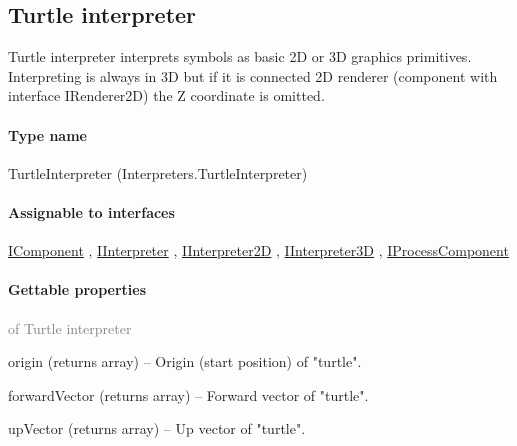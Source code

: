 \subsection{Turtle interpreter}
\label{Malsys.Processing.Components.Interpreters.TurtleInterpreter}
Turtle interpreter interprets symbols as basic 2D or 3D graphics primitives.
            Interpreting is always in 3D but if it is connected 2D renderer
            (component with interface IRenderer2D) the Z coordinate is omitted.\paragraph{Type name}
TurtleInterpreter (Interpreters.TurtleInterpreter) 	\paragraph{Assignable to interfaces}
		\hyperref[Malsys.Processing.Components.IComponent]{IComponent}%
, 		\hyperref[Malsys.Processing.Components.IInterpreter]{IInterpreter}%
, 		\hyperref[Malsys.Processing.Components.Interpreters.IInterpreter2D]{IInterpreter2D}%
, 		\hyperref[Malsys.Processing.Components.Interpreters.IInterpreter3D]{IInterpreter3D}%
, 		\hyperref[Malsys.Processing.Components.IProcessComponent]{IProcessComponent}%
	\paragraph{Gettable properties}\textcolor{gray}{of Turtle interpreter}
	\begin{description*}
		\item[origin]
		(returns array)
			-- Origin (start position) of "turtle".
		\item[forwardVector]
		(returns array)
			-- Forward vector of "turtle".
		\item[upVector]
		(returns array)
			-- Up vector of "turtle".
	\end{description*}
